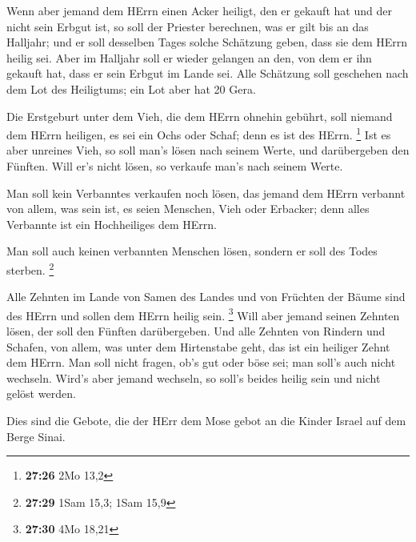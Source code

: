  Wenn aber jemand dem HErrn einen Acker heiligt, den er
gekauft hat und der nicht sein Erbgut ist,  so soll der
Priester berechnen, was er gilt bis an das Halljahr; und er soll
desselben Tages solche Schätzung geben, dass sie dem HErrn heilig sei.
 Aber im Halljahr soll er wieder gelangen an den, von dem
er ihn gekauft hat, dass er sein Erbgut im Lande sei.  Alle
Schätzung soll geschehen nach dem Lot des Heiligtums; ein Lot aber hat
20 Gera.

 Die Erstgeburt unter dem Vieh, die dem HErrn ohnehin
gebührt, soll niemand dem HErrn heiligen, es sei ein Ochs oder Schaf;
denn es ist des HErrn. \footnote{\textbf{27:26} 2Mo 13,2} 
Ist es aber unreines Vieh, so soll man's lösen nach seinem Werte, und
darübergeben den Fünften. Will er's nicht lösen, so verkaufe man's nach
seinem Werte.

 Man soll kein Verbanntes verkaufen noch lösen, das jemand
dem HErrn verbannt von allem, was sein ist, es seien Menschen, Vieh oder
Erbacker; denn alles Verbannte ist ein Hochheiliges dem HErrn.

 Man soll auch keinen verbannten Menschen lösen, sondern er
soll des Todes sterben. \footnote{\textbf{27:29} 1Sam 15,3; 1Sam 15,9}

 Alle Zehnten im Lande von Samen des Landes und von
Früchten der Bäume sind des HErrn und sollen dem HErrn heilig sein.
\footnote{\textbf{27:30} 4Mo 18,21}  Will aber jemand
seinen Zehnten lösen, der soll den Fünften darübergeben. 
Und alle Zehnten von Rindern und Schafen, von allem, was unter dem
Hirtenstabe geht, das ist ein heiliger Zehnt dem HErrn. 
Man soll nicht fragen, ob's gut oder böse sei; man soll's auch nicht
wechseln. Wird's aber jemand wechseln, so soll's beides heilig sein und
nicht gelöst werden.

 Dies sind die Gebote, die der HErr dem Mose gebot an die
Kinder Israel auf dem Berge Sinai.
